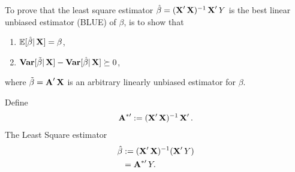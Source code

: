 \documentclass[UTF8,a4paper,10pt]{article}
\begin{document}
    \begin{solution}

      To prove that the least square estimator \(\hat{\beta} = (\operatorname{\mathbf{X}}'\operatorname{\mathbf{X}})^{-1}\operatorname{\mathbf{X}}'Y\) is the best linear unbiased estimator (BLUE) of \(\beta\), is to show that
      \begin{enumerate}[label=(\alph*)]
        \item \(\operatorname{\mathbb{E}}[\hat{\beta}|\operatorname{\mathbf{X}}] = \beta\),
        \item \(\operatorname{\textbf{Var}}[\tilde{\beta}|\operatorname{\mathbf{X}}]-\operatorname{\textbf{Var}}[\hat{\beta}|\operatorname{\mathbf{X}}]\succeq 0\),
      \end{enumerate}
      where \(\tilde{\beta} = \operatorname{\textbf{A}}'\operatorname{\mathbf{X}}\) is an arbitrary linearly unbiased estimator for \(\beta\).

      \dotfill



      Define
      \begin{equation*}
        \begin{aligned}
          \operatorname{\textbf{A}}^{*\prime}:= (\operatorname{\mathbf{X}}'\operatorname{\mathbf{X}})^{-1}\operatorname{\mathbf{X}}'.
        \end{aligned}
      \end{equation*}
    The Least Square estimator 
      \begin{equation*}
        \begin{aligned}
          \hat{\beta} &:= (\operatorname{\mathbf{X}}'\operatorname{\mathbf{X}})^{-1}(\operatorname{\mathbf{X}}'Y)\\
          &=\operatorname{\textbf{A}}^{*\prime}Y.
        \end{aligned}
      \end{equation*}



\end{solution}
\end{document}
